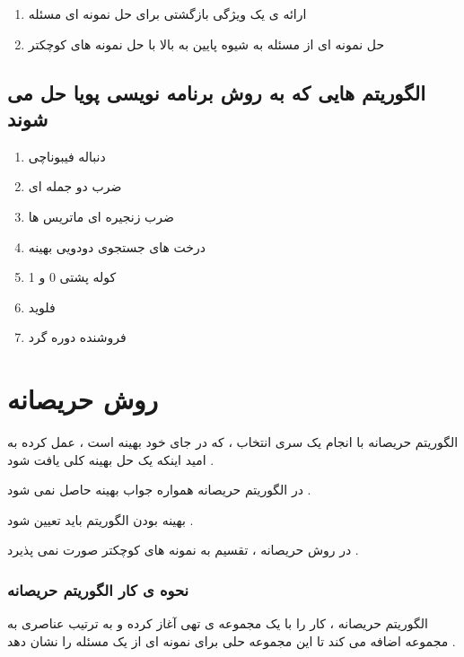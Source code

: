 \documentclass[12pt]{book}
\begin{document}
\begin{enumerate}
	\item ارائه ی یک ویژگی بازگشتی برای حل نمونه ای مسئله
	\item حل نمونه ای از مسئله به شیوه پایین به بالا با حل نمونه های کوچکتر
\end{enumerate}



\section{الگوریتم هایی که به روش برنامه نویسی پویا حل می شوند}



\begin{enumerate}
	\item دنباله فیبوناچی
	\item ضرب دو جمله ای
	\item ضرب زنجیره ای ماتریس ها
	\item درخت های جستجوی دودویی بهینه
	\item کوله پشتی 0 و 1
	\item فلوید
	\item فروشنده دوره گرد
\end{enumerate}







\chapter{روش حریصانه}


\noindent
الگوریتم حریصانه با انجام یک سری انتخاب ، که در جای خود بهینه است ، عمل کرده به امید اینکه یک حل بهینه کلی یافت شود .

\noindent
در الگوریتم حریصانه همواره جواب بهینه حاصل نمی شود .


\noindent
بهینه بودن الگوریتم باید تعیین شود .


\noindent
در روش حریصانه ، تقسیم به نمونه های کوچکتر صورت نمی پذیرد .



\subsection{نحوه ی کار الگوریتم حریصانه}


الگوریتم حریصانه ، کار را با یک مجموعه ی تهی آغاز کرده و به ترتیب عناصری به مجموعه اضافه می کند تا این مجموعه حلی برای نمونه ای از یک مسئله را نشان دهد .
\end{document}
